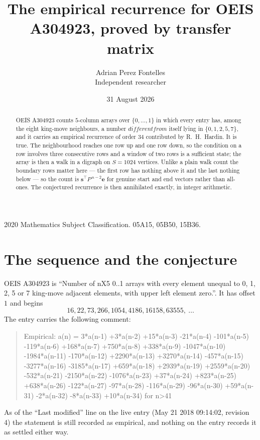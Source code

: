 \documentclass[11pt,a4paper]{article}
\title{The empirical recurrence for OEIS A304923, proved by transfer matrix}
\author{Adrian Perez Fontelles\\ \small Independent researcher}
\date{31 August 2026}
\theoremstyle{plain}
\theoremstyle{definition}
\begin{document}
\maketitle

\begin{abstract}
OEIS A304923 counts $5$-column arrays over $\{0,\dots,1\}$ in which every entry has,
among the eight king-move neighbours, a number $different from$ itself lying in $\{0,1,2,5,7\}$, and it carries an empirical
recurrence of order $34$ contributed by R.~H.~Hardin. It is true. The neighbourhood
reaches one row up and one row down, so the condition on a row involves three consecutive
rows and a window of two rows is a sufficient state; the array is then a walk in a digraph
on $S=1024$ vertices. Unlike a plain walk count the boundary rows matter here --- the first
row has nothing above it and the last nothing below --- so the count is
$\mathbf{s}^{\!\top}P^{\,n-2}\mathbf{e}$ for genuine start and end vectors rather than
all-ones. The conjectured recurrence is then annihilated exactly, in integer arithmetic.
\end{abstract}

\noindent\small 2020 Mathematics Subject Classification. 05A15, 05B50, 15B36.\normalsize

\section{The sequence and the conjecture}

OEIS A304923 is ``Number of nX5 0..1 arrays with every element unequal to 0, 1, 2, 5 or 7 king-move adjacent elements, with upper left element zero.''. It has offset
$1$ and begins
\[
16, 22, 73, 266, 1054, 4186, 16158, 63555,\ \dots
\]
The entry carries the following comment:
\begin{quote}\small
Empirical: a(n) = 3*a(n-1) +3*a(n-2) +15*a(n-3) -21*a(n-4) -101*a(n-5) -119*a(n-6) +168*a(n-7) +750*a(n-8) +338*a(n-9) -1047*a(n-10) -1984*a(n-11) -170*a(n-12) +2290*a(n-13) +3270*a(n-14) -457*a(n-15) -3277*a(n-16) -3185*a(n-17) +659*a(n-18) +2939*a(n-19) +2559*a(n-20) -532*a(n-21) -2150*a(n-22) -1076*a(n-23) +37*a(n-24) +823*a(n-25) +638*a(n-26) -122*a(n-27) -97*a(n-28) -116*a(n-29) -96*a(n-30) +59*a(n-31) -2*a(n-32) -8*a(n-33) +10*a(n-34) for n>41
\end{quote}
As of the ``Last modified'' line on the live entry (May 21 2018 09:14:02, revision
4) the statement is still recorded as empirical, and nothing on the entry
records it as settled either way.
\end{document}
